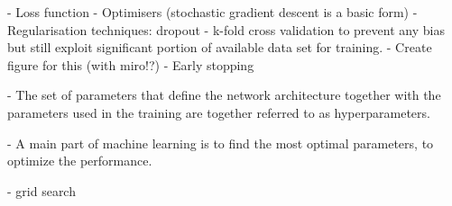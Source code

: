 - Loss function
- Optimisers (stochastic gradient descent is a basic form)
- Regularisation techniques: dropout
- k-fold cross validation to prevent any bias but still exploit significant portion of available data set for training.
    - Create figure for this (with miro!?)
- Early stopping

- The set of parameters that define the network architecture together with the parameters used in the training are together referred to as hyperparameters. 

- A main part of machine learning is to find the most optimal parameters, to optimize the performance. 

- grid search

